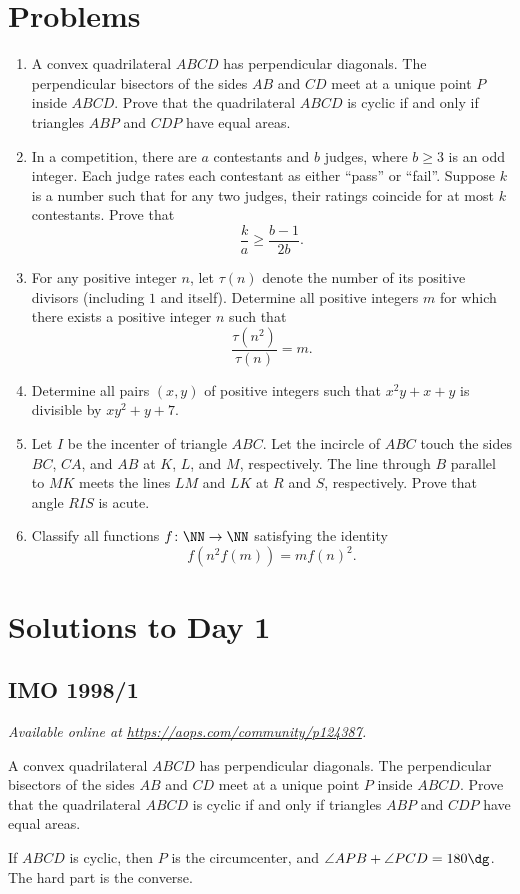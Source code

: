 \documentclass[11pt]{scrartcl}
\begin{document}
\section{Problems}
\begin{enumerate}[\bfseries 1.]
\item %
A convex quadrilateral $ABCD$ has perpendicular diagonals.
The perpendicular bisectors of the sides $AB$ and $CD$ meet
at a unique point $P$ inside $ABCD$.
Prove that the quadrilateral $ABCD$ is cyclic
if and only if triangles $ABP$ and $CDP$ have equal areas.

\item %
In a competition, there are $a$ contestants
and $b$ judges, where $b \ge 3$ is an odd integer.
Each judge rates each contestant as either ``pass'' or ``fail''.
Suppose $k$ is a number such that for any two judges,
their ratings coincide for at most $k$ contestants.
Prove that
\[ \frac ka \ge \frac{b-1}{2b}. \]

\item %
For any positive integer $n$,
let $\tau (n)$ denote the number of its positive divisors
(including $1$ and itself).
Determine all positive integers $m$ for which
there exists a positive integer $n$ such that
\[ \frac{\tau (n^{2})}{\tau (n)}=m. \]

\item %
Determine all pairs $(x,y)$ of positive integers
such that $x^{2}y+x+y$ is divisible by $xy^{2}+y+7$.

\item %
Let $I$ be the incenter of triangle $ABC$.
Let the incircle of $ABC$ touch
the sides $BC$, $CA$, and $AB$ at $K$, $L$, and $M$, respectively.
The line through $B$ parallel to $MK$ meets the lines
$LM$ and $LK$ at $R$ and $S$, respectively.
Prove that angle $RIS$ is acute.

\item %
Classify all functions $f \colon \NN \to \NN$
satisfying the identity
\[ f(n^2 f(m)) = m f(n)^2. \]

\end{enumerate}
\pagebreak

\section{Solutions to Day 1}
\subsection{IMO 1998/1}
\textsl{Available online at \url{https://aops.com/community/p124387}.}
\begin{mdframed}[style=mdpurplebox,frametitle={Problem statement}]
A convex quadrilateral $ABCD$ has perpendicular diagonals.
The perpendicular bisectors of the sides $AB$ and $CD$ meet
at a unique point $P$ inside $ABCD$.
Prove that the quadrilateral $ABCD$ is cyclic
if and only if triangles $ABP$ and $CDP$ have equal areas.
\end{mdframed}
If $ABCD$ is cyclic, then $P$ is the circumcenter,
and $\angle APB + \angle PCD = 180\dg$.
The hard part is the converse.
\end{document}
